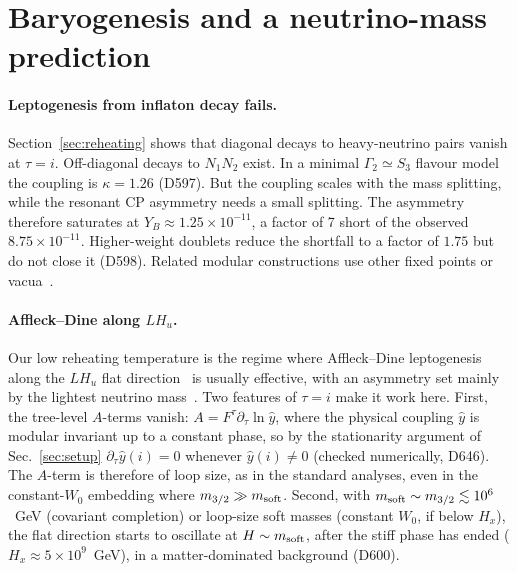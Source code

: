 \documentclass[aps,prd,twocolumn,superscriptaddress,nofootinbib,floatfix]{revtex4-2}
\begin{document}
\section{Baryogenesis and a neutrino-mass prediction}\label{sec:baryo}
\paragraph{Leptogenesis from inflaton decay fails.} Section~\ref{sec:reheating} shows that diagonal decays to heavy-neutrino pairs vanish at $\tau = i$. Off-diagonal decays to $N_1N_2$ exist. In a minimal $\Gamma_2 \simeq S_3$ flavour model the coupling is $\kappa = 1.26$ (D597). But the coupling scales with the mass splitting, while the resonant CP asymmetry needs a small splitting. The asymmetry therefore saturates at $Y_B \approx 1.25\times10^{-11}$, a factor of 7 short of the observed $8.75\times10^{-11}$. Higher-weight doublets reduce the shortfall to a factor of $1.75$ but do not close it (D598). Related modular constructions use other fixed points or vacua~\cite{arXiv_2411_18603,arXiv_2604_04585}.

\paragraph{Affleck--Dine along $LH_u$.} Our low reheating temperature is the regime where Affleck--Dine leptogenesis~\cite{AffleckDine1985,arXiv_hep-ph_9507453} along the $LH_u$ flat direction~\cite{arXiv_hep-ph_9310297} is usually effective, with an asymmetry set mainly by the lightest neutrino mass~\cite{arXiv_hep-ph_0102187,arXiv_hep-ph_0109154}. Two features of $\tau=i$ make it work here. First, the tree-level $A$-terms vanish: $A=F^\tau\partial_\tau\ln\hat y$, where the physical coupling $\hat y$ is modular invariant up to a constant phase, so by the stationarity argument of Sec.~\ref{sec:setup} $\partial_\tau\hat y(i)=0$ whenever $\hat y(i)\neq0$ (checked numerically, D646). The $A$-term is therefore of loop size, as in the standard analyses, even in the constant-$W_0$ embedding where $m_{3/2}\gg m_{\rm soft}$. Second, with $m_{\rm soft}\sim m_{3/2}\lesssim10^6$~GeV (covariant completion) or loop-size soft masses (constant $W_0$, if below $H_x$), the flat direction starts to oscillate at $H\sim m_{\rm soft}$, after the stiff phase has ended ($H_x\approx5\times10^9$~GeV), in a matter-dominated background (D600).
\end{document}
